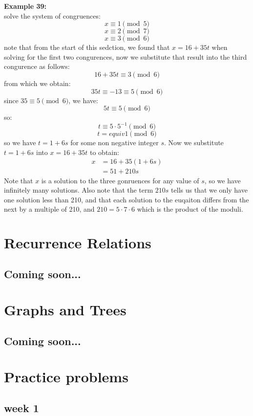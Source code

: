 \documentclass[12pt]{article}
\begin{document}
\newpage
\noindent\textbf{Example 39:}
\\ solve the system of congruences:
\[ x \equiv 1 \pmod{5} \]
\[ x \equiv 2 \pmod{7} \]
\[x \equiv 3 \pmod{6} \]
note that from the start of this sedction, we found that $x=16+35t$ when solving for the first two congurences, now we substitute that result into the third congurence as follows:
\[16 +35t \equiv 3 \pmod{6} \]
from which we obtain:
\[35t \equiv -13 \equiv 5 \pmod{6} \]
since $35 \equiv 5 \pmod{6}$, we have:
\[5t \equiv 5 \pmod{6} \]
so:
\[t \equiv 5 \cdot 5^{-1} \pmod{6} \]
\[ t =equiv 1 \pmod{6} \]
so we have $t=1+6s$ for some non negative integer $s$. Now we substitute $t=1+6s$ into $x=16+35t$ to obtain:
\begin{align*}
    x &= 16 + 35(1+6s) \\
    &= 51 + 210s
\end{align*}
Note that $x$ is a solution to the three gonruences for any value of $s$, so we have infinitely many solutions. Also note that the term $210s$ tells us that we only have one solution less than 210, and  that each solution to the euqaiton differs from the next by a multiple of 210, and $210=5 \cdot 7 \cdot 6$ which is the product of the moduli.

\newpage
\section{Recurrence Relations}
\subsection*{Coming soon...}

\newpage
\section{Graphs and Trees}
\subsection*{Coming soon...}

\newpage
\section{Practice problems}
\subsection*{week 1}
\end{document}
